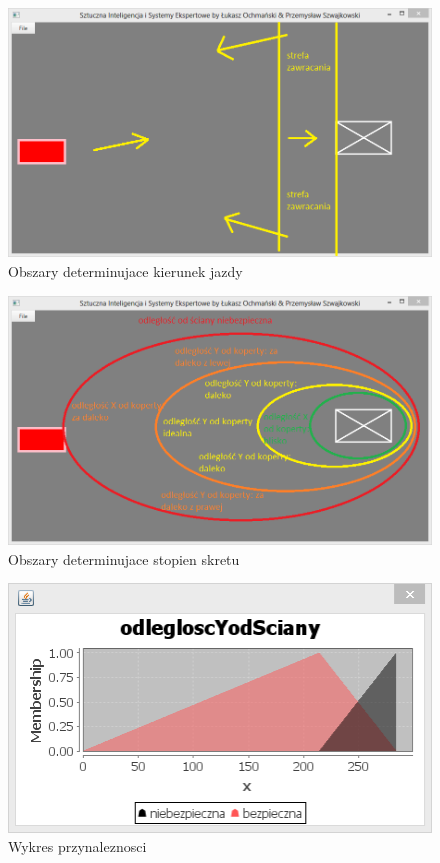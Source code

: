 \documentclass{classrep}
\begin{document}
\begin{figure}[ht]
\centering
			\includegraphics[scale=0.60]{pictures/Obraz13.png}
	\caption{Obszary determinujace kierunek jazdy}
	\label{fig:Obszary determinujace kierunek jazdy}
\end{figure}

\begin{figure}[ht]
\centering
			\includegraphics[scale=0.60]{pictures/Obraz14.png}
	\caption{Obszary determinujace stopien skretu}
	\label{fig:Obszary determinujace stopien skretu}
\end{figure}

\begin{figure}[ht]
\centering
			\includegraphics[scale=0.80]{pictures/Obraz02.png}
	\caption{Wykres przynaleznosci}
	\label{fig:Wykres przynaleznosci}
\end{figure}
\end{document}

